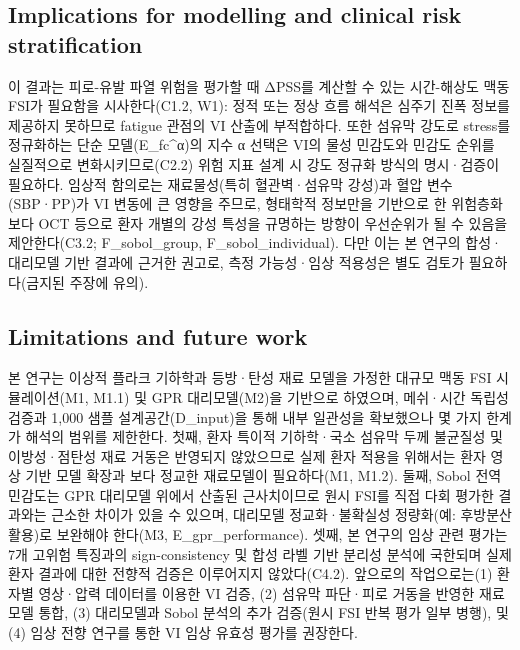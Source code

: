 \documentclass[preprint,12pt]{elsarticle}
\begin{document}
\subsection{Implications for modelling and clinical risk stratification}
이 결과는 피로-유발 파열 위험을 평가할 때 ΔPSS를 계산할 수 있는 시간-해상도 맥동 FSI가 필요함을 시사한다(C1.2, W1): 정적 또는 정상 흐름 해석은 심주기 진폭 정보를 제공하지 못하므로 fatigue 관점의 VI 산출에 부적합하다. 또한 섬유막 강도로 stress를 정규화하는 단순 모델(E\_fc\textasciicircum {α})의 지수 α 선택은 VI의 물성 민감도와 민감도 순위를 실질적으로 변화시키므로(C2.2) 위험 지표 설계 시 강도 정규화 방식의 명시·검증이 필요하다. 임상적 함의로는 재료물성(특히 혈관벽·섬유막 강성)과 혈압 변수(SBP·PP)가 VI 변동에 큰 영향을 주므로, 형태학적 정보만을 기반으로 한 위험층화보다 OCT 등으로 환자 개별의 강성 특성을 규명하는 방향이 우선순위가 될 수 있음을 제안한다(C3.2; F\_sobol\_group, F\_sobol\_individual). 다만 이는 본 연구의 합성·대리모델 기반 결과에 근거한 권고로, 측정 가능성·임상 적용성은 별도 검토가 필요하다(금지된 주장에 유의).

\subsection{Limitations and future work}
본 연구는 이상적 플라크 기하학과 등방·탄성 재료 모델을 가정한 대규모 맥동 FSI 시뮬레이션(M1, M1.1) 및 GPR 대리모델(M2)을 기반으로 하였으며, 메쉬·시간 독립성 검증과 1,000 샘플 설계공간(D\_input)을 통해 내부 일관성을 확보했으나 몇 가지 한계가 해석의 범위를 제한한다. 첫째, 환자 특이적 기하학·국소 섬유막 두께 불균질성 및 이방성·점탄성 재료 거동은 반영되지 않았으므로 실제 환자 적용을 위해서는 환자 영상 기반 모델 확장과 보다 정교한 재료모델이 필요하다(M1, M1.2). 둘째, Sobol 전역 민감도는 GPR 대리모델 위에서 산출된 근사치이므로 원시 FSI를 직접 다회 평가한 결과와는 근소한 차이가 있을 수 있으며, 대리모델 정교화·불확실성 정량화(예: 후방분산 활용)로 보완해야 한다(M3, E\_gpr\_performance). 셋째, 본 연구의 임상 관련 평가는 7개 고위험 특징과의 sign-consistency 및 합성 라벨 기반 분리성 분석에 국한되며 실제 환자 결과에 대한 전향적 검증은 이루어지지 않았다(C4.2). 앞으로의 작업으로는(1) 환자별 영상·압력 데이터를 이용한 VI 검증, (2) 섬유막 파단·피로 거동을 반영한 재료 모델 통합, (3) 대리모델과 Sobol 분석의 추가 검증(원시 FSI 반복 평가 일부 병행), 및 (4) 임상 전향 연구를 통한 VI 임상 유효성 평가를 권장한다.
\end{document}
